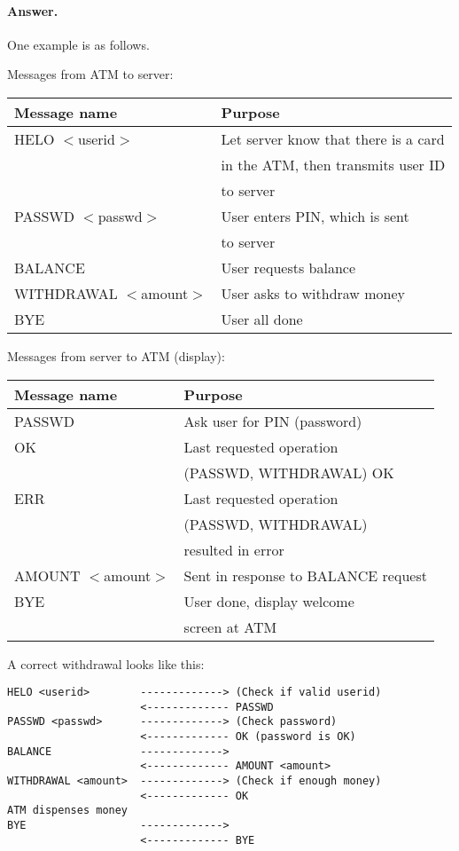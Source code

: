 \paragraph{Answer.} One example is as follows.

\noindent Messages from ATM to server:

  {\small
  \begin{tabular}{l|l}
  Message name & Purpose\\
  \hline \hline
  HELO \(<\)userid\(>\)   & Let server know that there is a card\\
                          & in the ATM, then transmits user ID\\
                          & to server\\
  PASSWD \(<\)passwd\(>\) & User enters PIN, which is sent\\
                          & to server\\
  BALANCE                 & User requests balance\\
  WITHDRAWAL \(<\)amount\(>\) 
                          & User asks to withdraw money\\
  BYE                     & User all done
  \end{tabular}
  }

  \medskip

\noindent Messages from server to ATM (display):

  \begin{tabular}{l|l}
  Message name & Purpose\\
  \hline \hline
  PASSWD  & Ask user for PIN (password)\\
  OK      & Last requested operation\\
          & (PASSWD, WITHDRAWAL) OK\\
  ERR     & Last requested operation\\
          & (PASSWD, WITHDRAWAL)\\
          & resulted in error\\
  AMOUNT \(<\)amount\(>\) & Sent in response to
                            BALANCE request\\
  BYE     & User done, display welcome\\
          & screen at ATM
  \end{tabular}   

\noindent A correct withdrawal looks like this:
{\small
  \begin{verbatim}
HELO <userid>        -------------> (Check if valid userid)
                     <------------- PASSWD
PASSWD <passwd>      -------------> (Check password)
                     <------------- OK (password is OK)
BALANCE              ------------->
                     <------------- AMOUNT <amount>
WITHDRAWAL <amount>  -------------> (Check if enough money)
                     <------------- OK
ATM dispenses money
BYE                  ------------->
                     <------------- BYE
  \end{verbatim}
}
